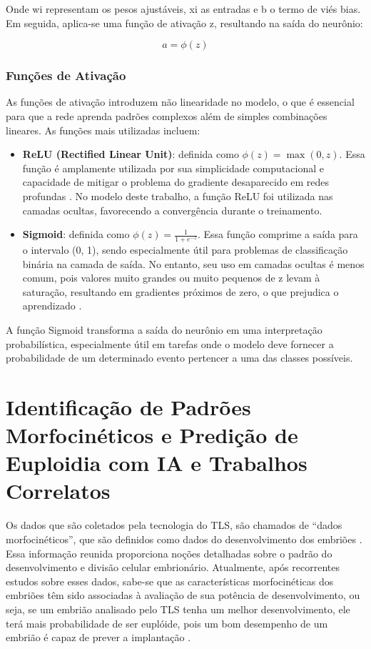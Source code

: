 Onde wi representam os pesos ajustáveis, xi as entradas e b o termo de viés bias. Em seguida, aplica-se uma função de ativação z, resultando na saída do neurônio:

\begin{equation}
    a = \phi(z)
\end{equation}

\subsubsection{Funções de Ativação}

As funções de ativação introduzem não linearidade no modelo, o que é essencial para que a rede aprenda padrões complexos além de simples combinações lineares. As funções mais utilizadas incluem:

\begin{itemize}
    \item \textbf{ReLU (Rectified Linear Unit)}: definida como $\phi(z) = \max(0, z)$. Essa função é amplamente utilizada por sua simplicidade computacional e capacidade de mitigar o problema do gradiente desaparecido em redes profundas \cite{haykin2009}. No modelo deste trabalho, a função ReLU foi utilizada nas camadas ocultas, favorecendo a convergência durante o treinamento.
   
    \item \textbf{Sigmoid}: definida como $\phi(z) = \frac{1}{1 + e^{-z}}$. Essa função comprime a saída para o intervalo (0, 1), sendo especialmente útil para problemas de classificação binária na camada de saída. No entanto, seu uso em camadas ocultas é menos comum, pois valores muito grandes ou muito pequenos de z levam à saturação, resultando em gradientes próximos de zero, o que prejudica o aprendizado \cite{haykin2009}.
\end{itemize}

A função Sigmoid transforma a saída do neurônio em uma interpretação probabilística, especialmente útil em tarefas onde o modelo deve fornecer a probabilidade de um determinado evento pertencer a uma das classes possíveis.

\section{Identificação de Padrões Morfocinéticos e Predição de Euploidia com IA e Trabalhos Correlatos}

Os dados que são coletados pela tecnologia do TLS, são chamados de “dados morfocinéticos”, que são definidos como dados do desenvolvimento dos embriões \cite{moustakli2024}. Essa informação reunida proporciona noções detalhadas sobre o padrão do desenvolvimento e divisão celular embrionário. Atualmente, após recorrentes estudos sobre esses dados, sabe-se que as características morfocinéticas dos embriões têm sido associadas à avaliação de sua potência de desenvolvimento, ou seja, se um embrião analisado pelo TLS tenha um melhor desenvolvimento, ele terá mais probabilidade de ser euplóide, pois um bom desempenho de um embrião é capaz de prever a implantação \cite{yuan2023}. 

